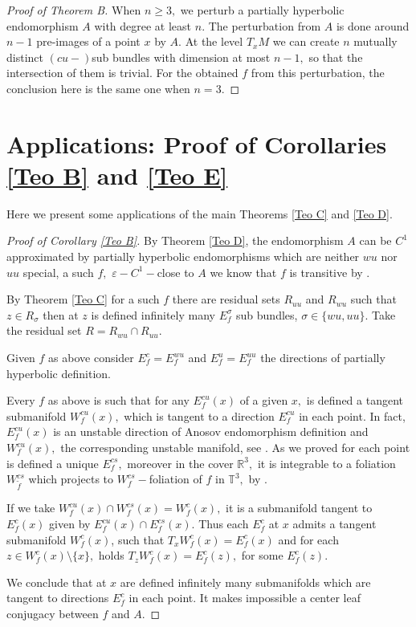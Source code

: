 \documentclass[12pt,reqno]{amsart}
\numberwithin{equation}{section}
\theoremstyle{plain}
\theoremstyle{remark}
\begin{document}
\begin{proof}[Proof of Theorem B]
When $n \geq 3,$ we perturb a partially hyperbolic endomorphism $A$ with degree at least $n.$ The perturbation from $A$ is done around $n-1$ pre-images of a point $x$ by $A.$ At the level $T_xM$ we can create $n$ mutually distinct $(cu-)$sub bundles with dimension at most $n-1,$ so that the intersection of them is trivial. For the obtained $f$ from this perturbation, the conclusion here is the same one when $n=3.$




\end{proof}




\section{ Applications: Proof of Corollaries \ref{Teo B} and \ref{Teo E}}

Here we present some applications of the main Theorems \ref{Teo C} and \ref{Teo D}.

\begin{proof}[Proof of Corollary \ref{Teo B}]
By Theorem \ref{Teo D}, the endomorphism $A$ can be $C^1$ approximated by partially hyperbolic endomorphisms which are neither $wu$ nor $uu$ special, a such $f,$  $\varepsilon -C^1-$close to $A$ we know that $f$ is transitive by \cite{AH}.

By Theorem \ref{Teo C} for a such $f$ there are residual sets $R_{uu}$ and $R_{wu}$ such that $z \in R_{\sigma}$ then at $z$ is defined infinitely many  $E^{\sigma}_f$ sub bundles, $\sigma \in \{wu, uu\}.$ Take the residual set $R = R_{wu} \cap R_{uu}.$


Given $f$ as above consider $E^c_f = E^{wu}_f$ and $E^u_f = E^{uu}_f$ the directions of partially hyperbolic definition.

Every $f$ as  above is such that for any $E^{cu}_f(x)$ of a given $x,$ is defined a tangent submanifold $W^{cu}_f(x),$ which is tangent to a direction $E^{cu}_f$ in each point. In fact,  $E^{cu}_f(x)$ is an unstable direction of Anosov endomorphism definition and  $W^{cu}_f(x),$ the corresponding unstable manifold, see \cite{PRZ}. As we proved for each point is defined a unique $E^{cs}_f,$ moreover in the cover $\mathbb{R}^3,$ it is integrable to a foliation $W^{cs}_{\widetilde{f}}$ which projects to $W_f^{cs}-$foliation of $f$ in $\mathbb{T}^3,$ by \cite{B}.

If we take $ W^{cu}_f(x) \cap W^{cs}_f(x) = W^c_f(x),$ it is a submanifold tangent to $E^{c}_f(x)$ given by $ E^{cu}_f(x)\cap E^{cs}_f(x).$  Thus each $E^c_f$ at $x$ admits a tangent submanifold $W^c_f(x)$, such that $T_xW^c_f(x) = E^c_f(x)$ and for each $z \in W^c_f(x) \setminus \{x\}, $ holds $T_zW^c_f(x) = E^c_f(z),$ for some $E^c_f(z).$

We conclude that at $x$ are defined infinitely many submanifolds which are tangent to directions $E^c_f$ in each point. It makes impossible a center leaf conjugacy between $f$ and $A.$
\end{proof}
\end{document}
